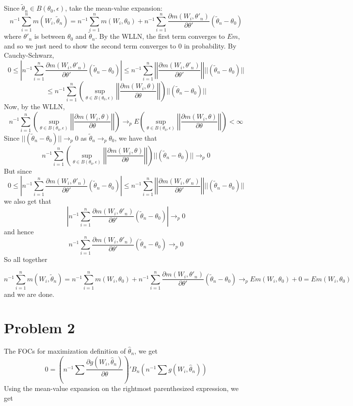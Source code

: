 \documentclass[10pt,letter]{article}
\begin{document}
Since $\tilde{\theta}_n \in B(\theta_0, \epsilon)$, take the mean-value expansion:
\[ n^{-1}\sum_{i=1}^n m(W_i, \tilde{\theta}_n) = n^{-1}\sum_{i=1}^n m(W_i, \theta_0) + n^{-1}\sum_{i=1}^n \frac{\partial m(W_i, \theta'_n)}{\partial \theta'}( \tilde{\theta}_n - \theta_0)  \]
where $\theta'_n$ is between $\theta_0$ and $\tilde{\theta}_n$. By the WLLN, the first term converges to $Em$, and so we just need to show the second term converges to 0 in probability. By Cauchy-Schwarz,
\[ 0 \le \left|n^{-1}\sum_{i=1}^n \frac{\partial m(W_i, \theta'_n)}{\partial \theta'}( \tilde{\theta}_n - \theta_0) \right| \le  n^{-1}\sum_{i=1}^n \left|\left|\frac{\partial m(W_i, \theta'_n)}{\partial \theta'}\right|\right| ||(\tilde{\theta}_n - \theta_0) ||  \]
\[ \le n^{-1}\sum_{i=1}^n \left(\sup_{\theta \in B(\theta_0, \epsilon)} \left|\left|\frac{\partial m(W_i, \theta)}{\partial \theta}\right|\right| \right)||(\tilde{\theta}_n - \theta_0) || \]
Now, by the WLLN,
\[ n^{-1}\sum_{i=1}^n \left(\sup_{\theta \in B(\theta_0, \epsilon)} \left|\left|\frac{\partial m(W_i, \theta)}{\partial \theta}\right|\right| \right) \to_p E\left(\sup_{\theta \in B(\theta_0, \epsilon)} \left|\left|\frac{\partial m(W_i, \theta)}{\partial \theta}\right|\right| \right) < \infty \]
Since $||(\tilde{\theta}_n - \theta_0) || \to_p 0$ as $\tilde{\theta}_n \to_p \theta_0$, we have that
\[ n^{-1}\sum_{i=1}^n \left(\sup_{\theta \in B(\theta_0, \epsilon)} \left|\left|\frac{\partial m(W_i, \theta)}{\partial \theta}\right|\right| \right)||(\tilde{\theta}_n - \theta_0) || \to_p 0 \]
But since
\[ 0 \le \left|n^{-1}\sum_{i=1}^n \frac{\partial m(W_i, \theta'_n)}{\partial \theta'}( \tilde{\theta}_n - \theta_0) \right| \le  n^{-1}\sum_{i=1}^n \left|\left|\frac{\partial m(W_i, \theta'_n)}{\partial \theta'}\right|\right| ||(\tilde{\theta}_n - \theta_0) ||  \]
we also get that
\[\left|n^{-1}\sum_{i=1}^n \frac{\partial m(W_i, \theta'_n)}{\partial \theta'}( \tilde{\theta}_n - \theta_0) \right| \to_p 0 \]
and hence
\[ n^{-1}\sum_{i=1}^n \frac{\partial m(W_i, \theta'_n)}{\partial \theta'}( \tilde{\theta}_n - \theta_0) \to_p 0 \]
So all together

\[ n^{-1}\sum_{i=1}^n m(W_i, \tilde{\theta}_n) = n^{-1}\sum_{i=1}^n m(W_i, \theta_0) + n^{-1}\sum_{i=1}^n \frac{\partial m(W_i, \theta'_n)}{\partial \theta'}( \tilde{\theta}_n - \theta_0) \to_p Em(W_i, \theta_0) + 0 = Em(W_i, \theta_0) \]
and we are done.
\section*{Problem 2}
The FOCs for maximization definition of $\hat{\theta}_n$, we get
\[ 0 = \left(n^{-1} \sum \frac{\partial g(W_i, \hat{\theta}_n)}{\partial \theta} \right)' B_n \left(n^{-1}\sum g(W_i, \hat{\theta}_n) \right)\]
Using the mean-value expansion on the rightmost parenthesized expression, we get
\end{document}
